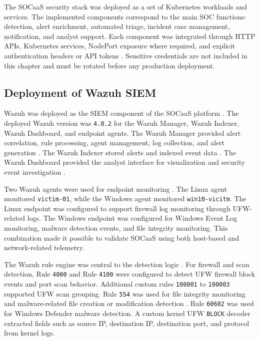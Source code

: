 The SOCaaS security stack was deployed as a set of Kubernetes workloads and services. The implemented components correspond to the main SOC functions: detection, alert enrichment, automated triage, incident case management, notification, and analyst support. Each component was integrated through HTTP APIs, Kubernetes services, NodePort exposure where required, and explicit authentication headers or API tokens \cite{ch4-kubernetes-services,ch4-owasp-api-security}. Sensitive credentials are not included in this chapter and must be rotated before any production deployment.

\subsection{Deployment of Wazuh SIEM}
\label{subsec:ch4-deployment-of-wazuh-siem}

Wazuh was deployed as the SIEM component of the SOCaaS platform \cite{ch4-wazuh-docs}. The deployed Wazuh version was \texttt{4.8.2} for the Wazuh Manager, Wazuh Indexer, Wazuh Dashboard, and endpoint agents. The Wazuh Manager provided alert correlation, rule processing, agent management, log collection, and alert generation \cite{ch4-wazuh-server-docs,ch4-wazuh-ruleset-docs}. The Wazuh Indexer stored alerts and indexed event data \cite{ch4-wazuh-indexer-docs}. The Wazuh Dashboard provided the analyst interface for visualization and security event investigation \cite{ch4-wazuh-dashboard-docs}.

Two Wazuh agents were used for endpoint monitoring \cite{ch4-wazuh-agent-docs}. The Linux agent monitored \texttt{victim-01}, while the Windows agent monitored \texttt{win10-vicitm}. The Linux endpoint was configured to support firewall log monitoring through UFW-related logs. The Windows endpoint was configured for Windows Event Log monitoring, malware detection events, and file integrity monitoring. This combination made it possible to validate SOCaaS using both host-based and network-related telemetry.

The Wazuh rule engine was central to the detection logic \cite{ch4-wazuh-ruleset-docs}. For firewall and scan detection, Rule \texttt{4000} and Rule \texttt{4100} were configured to detect UFW firewall block events and port scan behavior. Additional custom rules \texttt{100001} to \texttt{100003} supported UFW scan grouping. Rule \texttt{554} was used for file integrity monitoring and malware-related file creation or modification detection \cite{ch4-wazuh-fim-docs,ch4-wazuh-malware-docs}. Rule \texttt{60602} was used for Windows Defender malware detection. A custom kernel UFW \texttt{BLOCK} decoder extracted fields such as source IP, destination IP, destination port, and protocol from kernel logs.

